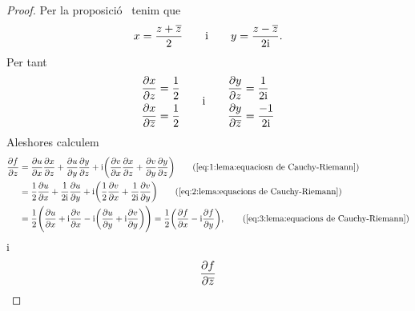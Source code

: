 \documentclass[../Apunts.tex]{subfiles}
\begin{document}
    \begin{proof}
        Per la proposició~ tenim que
        \[
            x=\frac{z+\overline{z}}{2}
            \qquad\text{i}\qquad
            y=\frac{z-\overline{z}}{2\mathrm{i}}.
        \]
        Per tant
        \begin{gather}
            \label{eq:2:lema:equacions de Cauchy-Riemann}
            \begin{split}
                \frac{\partial x}{\partial z}&=\frac{1}{2}\\
                \frac{\partial x}{\partial\overline{z}}&=\frac{1}{2}
            \end{split}\qquad\text{i}\qquad
            \begin{split}
                \frac{\partial y}{\partial z}&=\frac{1}{2\mathrm{i}}\\
                \frac{\partial y}{\partial\overline{z}}&=\frac{-1}{2\mathrm{i}}
            \end{split}
        \end{gather}
        Aleshores calculem
        \begin{align*}
            \frac{\partial f}{\partial z}
            &=\frac{\partial u}{\partial x}\frac{\partial x}{\partial z}
            +\frac{\partial u}{\partial y}\frac{\partial y}{\partial z}
            +\iu\biggl(\frac{\partial v}{\partial x}\frac{\partial x}{\partial z}
            +\frac{\partial v}{\partial y}\frac{\partial y}{\partial z}\biggr)
            \tag{\ref{eq:1:lema:equaciosn de Cauchy-Riemann}}\\
            &=\frac{1}{2}\frac{\partial u}{\partial x}+
            \frac{1}{2\iu}\frac{\partial u}{\partial y}+
            \iu\biggl(\frac{1}{2}\frac{\partial v}{\partial x}
            +\frac{1}{2\iu}\frac{\partial v}{\partial y}\biggr)
            \tag{\ref{eq:2:lema:equacions de Cauchy-Riemann}}\\
            &=\frac{1}{2}\Biggl(\frac{\partial u}{\partial x}
            +\iu\frac{\partial v}{\partial x}
            -\iu\biggl(\frac{\partial u}{\partial y}
            +\iu\frac{\partial v}{\partial y}\biggr)\Biggr)
            =\frac{1}{2}\biggl(\frac{\partial f}{\partial x}
            -\iu\frac{\partial f}{\partial y}\biggr),
            \tag{\ref{eq:3:lema:equacions de Cauchy-Riemann}}
        \end{align*}
        i
        \begin{align*}
            \frac{\partial f}{\partial\conjugat{z}}

\end{align*}
\end{proof}
\end{document}
